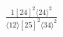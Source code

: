 \documentclass[varwidth, border=5pt]{standalone}
\begin{document}
\begin{my}
$\begin{gathered}
\scriptscriptstyle\frac{1[24]^2⟨24⟩^2}{⟨12⟩[25]^2⟨34⟩^2}
\end{gathered}$
\end{my}
\end{document}
